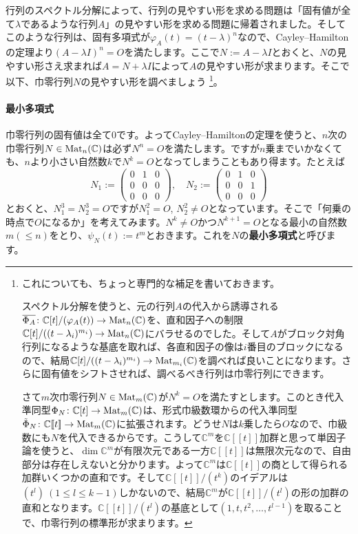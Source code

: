 行列のスペクトル分解によって、行列の見やすい形を求める問題は「固有値が全て$\lambda$であるような行列$A$」の見やすい形を求める問題に帰着されました。そしてこのような行列は、固有多項式が$\varphi_A(t) = (t - \lambda)^n$なので、Cayley--Hamiltonの定理より$(A - \lambda I)^n = O$を満たします。ここで$N := A - \lambda I$とおくと、$N$の見やすい形さえ求まれば$A = N + \lambda I$によって$A$の見やすい形が求まります。そこで以下、巾零行列$N$の見やすい形を調べましょう
\footnote{
これについても、ちょっと専門的な補足を書いておきます。

スペクトル分解を使うと、元の行列$A$の代入から誘導される$\overline{\Phi_A}\colon \mathbb{C}[t]/(\varphi_A(t)) \rightarrow \operatorname{Mat}_n(\mathbb{C})$を、直和因子への制限$\mathbb{C}[t]/((t - \lambda_i)^{m_i}) \rightarrow \operatorname{Mat}_n(\mathbb{C})$にバラせるのでした。そして$A$がブロック対角行列になるような基底を取れば、各直和因子の像は$i$番目のブロックになるので、結局$\mathbb{C}[t]/((t- \lambda_i)^{m_i}) \rightarrow \operatorname{Mat}_{m_i}(\mathbb{C})$を調べれば良いことになります。さらに固有値をシフトさせれば、調べるべき行列は巾零行列にできます。

さて$m$次巾零行列$N \in \operatorname{Mat}_m(\mathbb{C})$が$N^k = O$を満たすとします。このとき代入準同型$\Phi_N \colon \mathbb{C}[t] \rightarrow \operatorname{Mat}_m(\mathbb{C})$は、形式巾級数環からの代入準同型$\tilde{\Phi}_N \colon \mathbb{C}[\![t]\!] \rightarrow \operatorname{Mat}_m(\mathbb{C})$に拡張されます。どうせ$N$は$k$乗したら$O$なので、巾級数にも$N$を代入できるからです。こうして$\mathbb{C}^m$を$\mathbb{C}[\![t]\!]$加群と思って単因子論を使うと、$\dim \mathbb{C}^m$が有限次元である一方$\mathbb{C}[\![t]\!]$は無限次元なので、自由部分は存在しえないと分かります。よって$\mathbb{C}^m$は$\mathbb{C}[\![t]\!]$の商として得られる加群いくつかの直和です。そして$\mathbb{C}[\![t]\!]/(t^k)$のイデアルは$(t^l)\ (1 \leq l \leq k - 1)$しかないので、結局$\mathbb{C}^m$が$\mathbb{C}[\![t]\!]/(t^l)$の形の加群の直和となります。$\mathbb{C}[\![t]\!]/(t^l)$の基底として$(1, t, t^2, \ldots, t^{l - 1})$を取ることで、巾零行列の標準形が求まります。	
}。

\paragraph{最小多項式}

巾零行列の固有値は全て$0$です。よってCayley--Hamiltonの定理を使うと、$n$次の巾零行列$N \in \operatorname{Mat}_n(\mathbb{C})$は必ず$N^n = O$を満たします。ですが$n$乗までいかなくても、$n$より小さい自然数$k$で$N^k = O$となってしまうこともあり得ます。たとえば
\[
N_1 :=
\begin{pmatrix}
0 & 1 & 0 \\
0 & 0 & 0 \\
0 & 0 & 0
\end{pmatrix}, \quad
N_2 :=
\begin{pmatrix}
0 & 1 & 0 \\
0 & 0 & 1 \\
0 & 0 & 0
\end{pmatrix}
\]
とおくと、$N_1^3 = N_2^3 = O$ですが$N_1^2 = O$, $N_2^2 \neq O$となっています。そこで「何乗の時点で$O$になるか」を考えてみます。$N^k \neq O$かつ$N^{k + 1} = O$となる最小の自然数$m (\leq n)$をとり、$\psi_N(t) := t^m$とおきます。これを$N$の\textbf{最小多項式}と呼びます。


